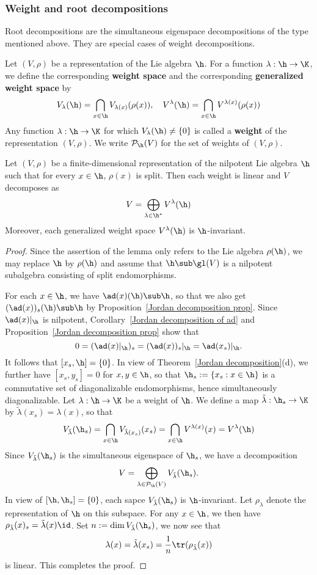 \subsubsection{Weight and root decompositions}
Root decompositions are the simultaneous eigenspace decompositions of the
type mentioned above. They are special cases of weight decompositions.
\begin{definition}
Let $(V,\rho)$ be a representation of the Lie algebra $\h$. For a function $\lambda:\h\to\K$, we define the corresponding \textbf{weight space} and the corresponding \textbf{generalized weight space} by
\[V_{\lambda}(\h)=\bigcap_{x\in\h}V_{\lambda(x)}(\rho(x)),\quad V^{\lambda}(\h)=\bigcap_{x\in\h}V^{\lambda(x)}(\rho(x))\]
Any function $\lambda:\h\to\K$ for which $V_{\lambda}(\h)\neq\{0\}$ is called a \textbf{weight} of the representation $(V,\rho)$. We write $\mathcal{P}_{\h}(V)$ for the set of weights of $(V,\rho)$.
\end{definition}
\begin{lemma}\label{Lie nilpotent subalgebra decomposition of representation}
Let $(V,\rho)$ be a finite-dimensional representation of the nilpotent Lie algebra $\h$ such that for every $x\in\h$, $\rho(x)$ is split. Then each weight is linear and $V$ decomposes as
\[V=\bigoplus_{\lambda\in\h^*}V^\lambda(\h)\]
Moreover, each generalized weight space $V^{\lambda}(\h)$ is $\h$-invariant.
\end{lemma}
\begin{proof}
Since the assertion of the lemma only refers to the Lie algebra $\rho(\h)$, we may replace $\h$ by $\rho(\h)$ and assume that $\h\sub\gl(V)$ is a nilpotent subalgebra consisting of split endomorphisms.\par
For each $x\in\h$, we have $\ad(x)(\h)\sub\h$, so that we also get $(\ad(x))_s(\h)\sub\h$ by Proposition~\ref{Jordan decomposition prop}. Since $\ad(x)|_{\h}$ is nilpotent, Corollary~\ref{Jordan decomposition of ad} and Proposition~\ref{Jordan decomposition prop} show that
\[0=(\ad(x)|_{\h})_s=(\ad(x))_s|_{\h}=\ad(x_s)|_{\h}.\]
It follows that $[x_s,\h]=\{0\}$. In view of Theorem~\ref{Jordan decomposition}(d), we further have $[x_s,y_s]=0$ for $x,y\in\h$, so that $\h_s:=\{x_s:x\in\h\}$ is a commutative set of diagonalizable endomorphisms, hence simultaneously diagonalizable. Let $\lambda:\h\to\K$ be a weight of $\h$. We define a map $\tilde{\lambda}:\h_s\to\K$ by $\tilde{\lambda}(x_s)=\lambda(x)$, so that
\[V_{\tilde{\lambda}}(\h_s)=\bigcap_{x\in\h}V_{\tilde{\lambda}(x_s)}(x_s)=\bigcap_{x\in\h}V^{\lambda(x)}(x)=V^{\lambda}(\h)\]
Since $V_{\tilde{\lambda}}(\h_s)$ is the simultaneous eigenspace of $\h_s$, we have a decomposition
\[V=\bigoplus_{\lambda\in\mathcal{P}_{\h}(V)}V_{\tilde{\lambda}}(\h_s).\]
In view of $[\h,\h_s]=\{0\}$, each sapce $V_{\tilde{\lambda}}(\h_s)$ is $\h$-invariant. Let $\rho_{\lambda}$ denote the representation of $\h$ on this subspace. For any $x\in\h$, we then have $\rho_{\tilde{\lambda}}(x)_s=\tilde{\lambda}(x)\id$. Set $n:=\dim V_{\tilde{\lambda}}(\h_s)$, we now see that
\[\lambda(x)=\tilde{\lambda}(x_s)=\frac{1}{n}\tr(\rho_{\tilde{\lambda}}(x))\]
is linear. This completes the proof.
\end{proof}
